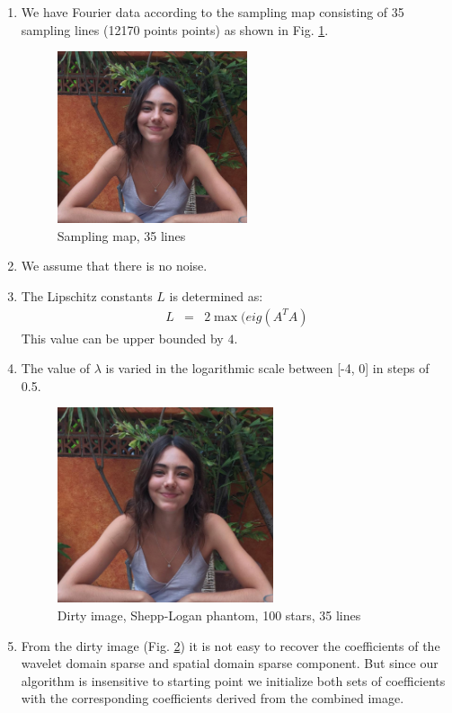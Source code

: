 \begin{enumerate}
\item We have Fourier data according to the sampling map consisting of 35 sampling lines (12170 points points) as shown in Fig. \ref{fig:expt43}.
 \begin{figure}[t!]
	\centering 
	\includegraphics[width=2.2in]{images/expt4/3.png}
	 \caption[Sampling map, 35 lines ]{\small Sampling map, 35 lines}
	\label{fig:expt43}
\end{figure}
\item We assume that there is no noise.
\item The Lipschitz constants $L$ is determined as:
\begin{eqnarray}
L &=& 2\max(eig( A^T A) 
\end{eqnarray}
This value can be upper bounded by $4$.
\item The value of $\lambda$ is varied in the logarithmic scale between [-4, 0] in steps of 0.5.
 \begin{figure}[b!]
	\centering \vspace{-0.1in}
	\includegraphics[width=2.5in]{images/expt4/4.png}
	 \caption[Dirty image, Shepp-Logan phantom, 100 stars, 35 lines ]{\small Dirty image, Shepp-Logan phantom, 100 stars, 35 lines}
	\label{fig:expt44}
\end{figure}
\item From the dirty image (Fig. \ref{fig:expt44}) it is not easy to recover the coefficients of the wavelet domain sparse and spatial domain sparse component. But since our algorithm is insensitive to starting point we initialize both sets of coefficients with the corresponding coefficients derived from the combined image.



\end{enumerate}
